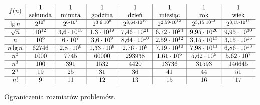 \begin{table}[ht]
	\begin{center}
		\[
			\begin{array}{c|c|c|c|c|c|c|c}
				&1&1&1&1&1&1&1 \\
				\raisebox{1.5ex}[0cm][0cm]{$f(n)$} & \text{sekunda} & \text{minuta} & \text{godzina} & \text{dzień} & \text{miesiąc} & \text{rok} & \text{wiek} \\
				\hline
				\lg n & 2^{10^6} & 2^{6\cdot10^7} & 2^{3{,}6\cdot10^9} & 2^{8{,}64\cdot10^{10}} & 2^{2{,}59\cdot10^{12}} & 2^{3{,}15\cdot10^{13}} & 2^{3{,}15\cdot10^{15}} \\
				\hline
				\sqrt{n} & 10^{12} & 3{,}6\cdot10^{15} & 1{,}3\cdot10^{19} & 7{,}46\cdot10^{21} & 6{,}72\cdot10^{24} & 9{,}95\cdot10^{26} & 9{,}95\cdot10^{30} \\
				\hline
				n & 10^6 & 6\cdot10^7 & 3{,}6\cdot10^9 & 8{,}64\cdot10^{10} & 2{,}59\cdot10^{12} & 3{,}15\cdot10^{13} & 3{,}15\cdot10^{15} \\
				\hline
				n\lg n & 62746 & 2{,}8\cdot10^6 & 1{,}33\cdot10^8 & 2{,}76\cdot10^9 & 7{,}19\cdot10^{10} & 7{,}98\cdot10^{11} & 6{,}86\cdot10^{13} \\
				\hline
				n^2 & 1000 & 7745 & 60000 & 293938 & 1{,}61\cdot10^6 & 5{,}62\cdot10^6 & 5{,}62\cdot10^7 \\
				\hline
				n^3 & 100 & 391 & 1532 & 4420 & 13736 & 31593 & 146645 \\
				\hline
				2^n & 19 & 25 & 31 & 36 & 41 & 44 & 51 \\
				\hline
				n! & 9 & 11 & 12 & 13 & 15 & 16 & 17
			\end{array}
		\]
	\end{center}
	\caption{Ograniczenia rozmiarów problemów.} \label{tab:1-1}
\end{table}

\endinput
